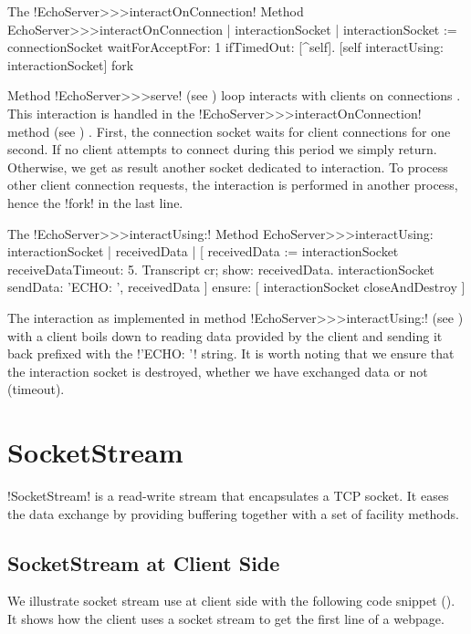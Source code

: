 \documentclass[a4paper,10pt,twoside]{book}
\begin{document}
\begin{method}{The \ct!EchoServer>>>interactOnConnection! Method}
EchoServer>>>interactOnConnection
	| interactionSocket |
	interactionSocket := connectionSocket waitForAcceptFor: 1 ifTimedOut: [^self].
	[self interactUsing: interactionSocket] fork
\end{method}

Method \ct!EchoServer>>>serve! (see ) loop interacts with clients on connections .
This interaction is handled in the \ct!EchoServer>>>interactOnConnection! method (see ) .
First, the connection socket waits for client connections for one second.
If no client attempts to connect during this period we simply return.
Otherwise, we get as result another socket dedicated to interaction.
To process other client connection requests, the interaction is performed in another process, hence the \ct!fork! in the last line.

\begin{method}{The \ct!EchoServer>>>interactUsing:! Method}
EchoServer>>>interactUsing: interactionSocket
	| receivedData |
	[ receivedData := interactionSocket receiveDataTimeout: 5.
	 Transcript cr; show: receivedData.
	 interactionSocket sendData: 'ECHO: ', receivedData
	] ensure: [
	 interactionSocket closeAndDestroy ]
\end{method}

The interaction as implemented in method \ct!EchoServer>>>interactUsing:! (see ) with a client boils down to reading data provided by the client and sending it back prefixed with the \ct!'ECHO: '! string.
It is worth noting that we ensure that the interaction socket is destroyed, whether we have exchanged data or not (timeout).

\section{SocketStream} 
\label{sec:socketStream}
\ct!SocketStream! is a read-write stream that encapsulates a TCP socket.
It eases the data exchange by providing buffering together with a set of facility methods.


\subsection{SocketStream at Client Side}
We illustrate socket stream use at client side with the following code snippet ().
It shows how the client uses a socket stream to get the first line of a webpage.
\end{document}
